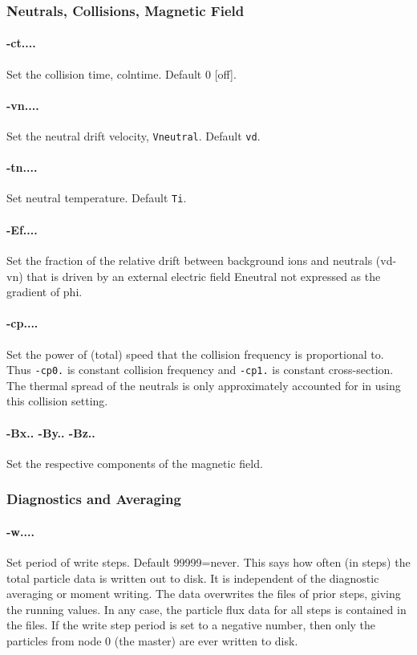 \documentclass[12pt]{article}
\begin{document}
\subsubsection*{Neutrals, Collisions, Magnetic Field}

\paragraph{-ct....} Set the collision time, colntime. Default 0 [off].

\paragraph{-vn....} Set the neutral drift velocity, \verb!Vneutral!. Default \verb!vd!.

\paragraph{-tn....} Set neutral temperature. Default \verb!Ti!. 

\paragraph{-Ef....} Set the fraction of the relative drift between
background ions and neutrals (vd-vn) that is driven by an external
electric field Eneutral not expressed as the gradient of phi.

\paragraph{-cp....} Set the power of (total) speed that the
collision frequency is proportional to. Thus \verb!-cp0.! is constant
collision frequency and \verb!-cp1.! is constant cross-section. The
thermal spread of the neutrals is only approximately accounted for in
using this collision setting.


\paragraph{-Bx.. -By.. -Bz..} Set the respective components of the
magnetic field. 

\subsubsection*{Diagnostics and Averaging}

\paragraph{-w....}  Set period of write steps. Default 99999=never.
This says how often (in steps) the total particle data is written out to
disk. It is independent of the diagnostic averaging or moment writing.
The data overwrites the files of prior steps, giving the running
values. In any case, the particle flux data for all steps is contained in
the files. If the write step period is set to a negative number, then
only the particles from node 0 (the master) are ever
written to disk. 
\end{document}
